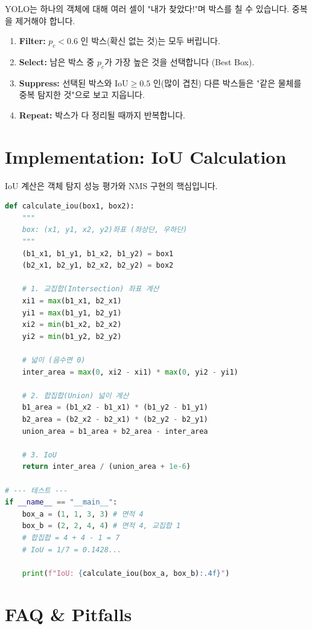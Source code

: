 \documentclass[11pt,a4paper]{book}
\theoremstyle{definition}
\begin{document}
YOLO는 하나의 객체에 대해 여러 셀이 "내가 찾았다!"며 박스를 칠 수 있습니다. 중복을 제거해야 합니다.

\begin{enumerate}
    \item \textbf{Filter:} $p_c < 0.6$ 인 박스(확신 없는 것)는 모두 버립니다.
    \item \textbf{Select:} 남은 박스 중 $p_c$가 가장 높은 것을 선택합니다 (Best Box).
    \item \textbf{Suppress:} 선택된 박스와 $\text{IoU} \ge 0.5$ 인(많이 겹친) 다른 박스들은 "같은 물체를 중복 탐지한 것"으로 보고 지웁니다.
    \item \textbf{Repeat:} 박스가 다 정리될 때까지 반복합니다.
\end{enumerate}

\section{Implementation: IoU Calculation}

IoU 계산은 객체 탐지 성능 평가와 NMS 구현의 핵심입니다.

\begin{lstlisting}[language=Python, caption=IoU Calculation Function, breaklines=true]
def calculate_iou(box1, box2):
    """
    box: (x1, y1, x2, y2)좌표 (좌상단, 우하단)
    """
    (b1_x1, b1_y1, b1_x2, b1_y2) = box1
    (b2_x1, b2_y1, b2_x2, b2_y2) = box2
    
    # 1. 교집합(Intersection) 좌표 계산
    xi1 = max(b1_x1, b2_x1)
    yi1 = max(b1_y1, b2_y1)
    xi2 = min(b1_x2, b2_x2)
    yi2 = min(b1_y2, b2_y2)
    
    # 넓이 (음수면 0)
    inter_area = max(0, xi2 - xi1) * max(0, yi2 - yi1)
    
    # 2. 합집합(Union) 넓이 계산
    b1_area = (b1_x2 - b1_x1) * (b1_y2 - b1_y1)
    b2_area = (b2_x2 - b2_x1) * (b2_y2 - b2_y1)
    union_area = b1_area + b2_area - inter_area
    
    # 3. IoU
    return inter_area / (union_area + 1e-6)

# --- 테스트 ---
if __name__ == "__main__":
    box_a = (1, 1, 3, 3) # 면적 4
    box_b = (2, 2, 4, 4) # 면적 4, 교집합 1
    # 합집합 = 4 + 4 - 1 = 7
    # IoU = 1/7 = 0.1428...
    
    print(f"IoU: {calculate_iou(box_a, box_b):.4f}")
\end{lstlisting}

\section{FAQ \& Pitfalls}
\end{document}
